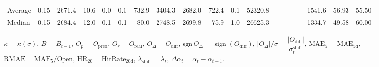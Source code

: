 \begin{threeparttable}
{\begin{tabular}{lrrrrrrrrrrrrrrrrr}
Average &     0.15 & 2671.4 &              10.6 &               0.0 &                0.0 &              732.9 &  3404.3 & 2682.0 &      722.4 &                      0.1 &             52320.8 &         -- &        -- &             -- &           1541.6 &           56.93 &                  55.50 \\
 Median &     0.15 & 2684.4 &              12.0 &               0.1 &                0.1 &               80.0 &  2748.5 & 2699.8 &       75.9 &                      1.0 &             26625.3 &         -- &        -- &             -- &           1334.7 &           49.58 &                  60.00 \\
\bottomrule
\end{tabular}
}
\begin{tablenotes}\footnotesize
\item $\kappa=\kappa(\sigma)$, $B=B_{t-1}$, $O_p=O_{\text{pred}}$, $O_r=O_{\text{real}}$, $O_\Delta=O_{\text{diff}}$, $\mathrm{sgn}\,O_\Delta=\operatorname{sign}(O_{\text{diff}})$, $|O_\Delta|/\sigma=\dfrac{|O_{\text{diff}}|}{\sigma_t^{\text{shift}}}$, $\mathrm{MAE}_5=\mathrm{MAE}_{5\text{d}}$, $\mathrm{RMAE}= \mathrm{MAE}_5 / \text{Open}$, $\mathrm{HR}_{20}=\mathrm{HitRate}_{20\text{d}}$, 
$\lambda_{\text{shift}}=\lambda_t$, 
$\Delta\alpha_t=\alpha_t-\alpha_{t-1}$.
\end{tablenotes}
\end{threeparttable}
\endgroup

